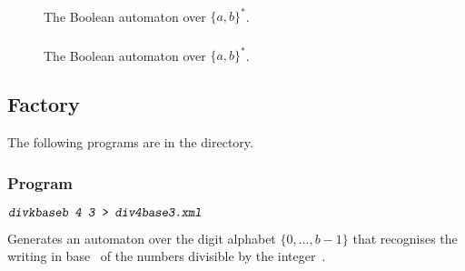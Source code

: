 \subsubsection{}

\begin{figure}[ht]
    \centering
{}
    \caption{The Boolean automaton  over
    $\{a,b\}^{*}$. }
\label{fig:evena-app}
\end{figure}

\subsubsection{}

\begin{figure}[ht]
    \centering
{}
    \caption{The Boolean automaton   over
    $\{a,b\}^{*}$. }
\label{fig:oddb-app}
\end{figure}

\subsection{Factory}

The following programs are in the
 directory.

\subsubsection{Program }


\begin{SwClCmd}
\begin{shell}
$ \textsl{\texttt{divkbaseb 4 3 > div4base3.xml}}
$
\end{shell}%
\end{SwClCmd}%
\begin{SwClTxt}
    Generates an automaton over the digit alphabet $\{0,\ldots,b-1\}$
    that recognises the writing in base~ of the numbers
    divisible by the integer~.
\end{SwClTxt}%

